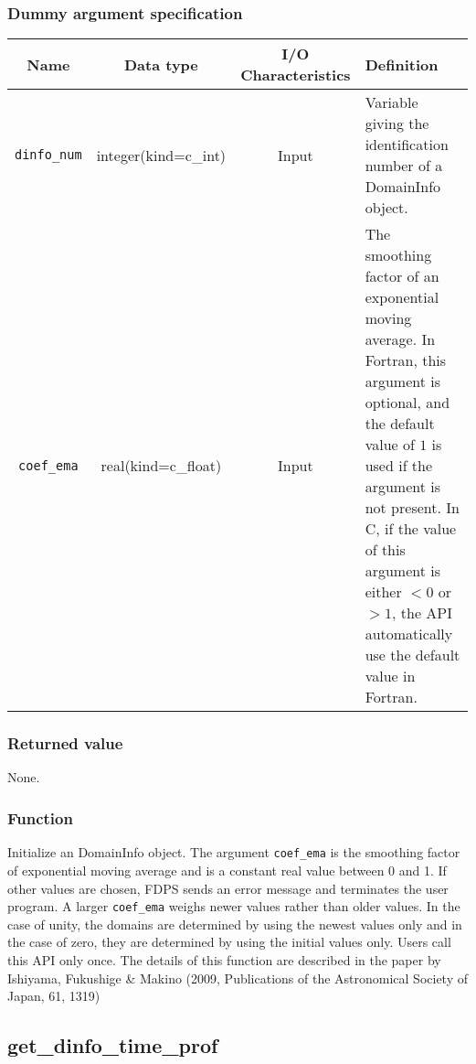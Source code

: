 \subsubsection*{Dummy argument specification}
\begin{table}[h]
\begin{tabularx}{\linewidth}{cccX}
\toprule
\rowcolor{Snow2}
Name & Data type & I/O Characteristics & Definition \\
\midrule
\texttt{dinfo\_num} & integer(kind=c\_int) & Input & 
Variable giving the identification number of a DomainInfo object.\\
\texttt{coef\_ema} & real(kind=c\_float) & Input & The smoothing factor of an exponential moving average. In Fortran, this argument is optional, and the default value of $1$ is used if the argument is not present. In C, if the value of this argument is either $<0$ or $>1$, the API automatically use the default value in Fortran. \\
\bottomrule
\end{tabularx}
\end{table}

\subsubsection*{Returned value}
None.

\subsubsection*{Function}
Initialize an DomainInfo object. The argument \texttt{coef\_ema} is the smoothing factor of exponential moving average and is a constant real value between 0 and 1. If other values are chosen, FDPS sends an error message and terminates the user program.  A larger \texttt{coef\_ema} weighs newer values rather than older values. In the case of unity, the domains are determined by using the newest values only and in the case of zero, they are determined by using the initial values only. Users call this API only once. The details of this function are described in the paper by Ishiyama, Fukushige \& Makino (2009, Publications of the Astronomical Society of Japan, 61, 1319)

\clearpage

\subsection{get\_dinfo\_time\_prof}
